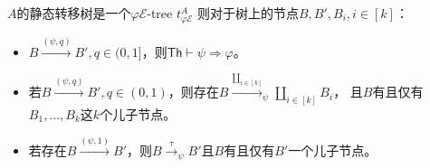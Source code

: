 \begin{corollary}
   $A$的静态转移树是一个$\varphi \mathcal{E}$-tree $t^A_{\varphi \mathcal{E}}$ 则对于树上的节点$B,B',B_i,i\in [k]$：
   \begin{itemize}
      \item {
         $B\stackrel{(\psi,q)}{\rightarrow}B',q\in(0,1]$，则$\mathsf{Th}\vdash\psi\Rightarrow\varphi$。
      }
      \item {
         若$B\stackrel{(\psi,q)}{\rightarrow}B',q\in (0,1)$，则存在$B\stackrel{\coprod_{i\in [k]}}{\longrightarrow}_{\psi} \coprod_{i\in [k]} B_i$，
         且$B$有且仅有$B_1,\dots, B_k$这$k$个儿子节点。
      }
      \item {
         若存在$B\stackrel{(\psi,1)}{\rightarrow}B'$，则$B\stackrel{\tau}{\rightarrow}_{\psi}B'$且$B$有且仅有$B'$一个儿子节点。
      }
   \end{itemize}
\end{corollary}

